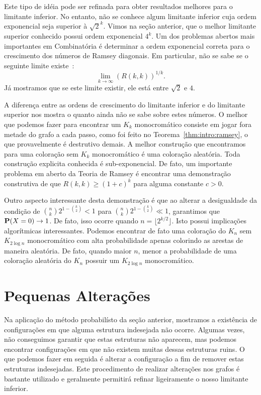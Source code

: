 Este tipo de idéia pode ser refinada para obter resultados melhores para o limitante inferior. No entanto, não se conhece algum limitante inferior cuja ordem exponencial seja superior à $\sqrt{2}^k$. Vimos na seção anterior, que o melhor limitante superior conhecido possui ordem exponencial $4^k$. Um dos problemas abertos mais importantes em Combinatória é determinar a ordem exponencial correta para o crescimento dos números de Ramsey diagonais. Em particular, não se sabe se o seguinte limite existe~\cite{chung1983survey}:
\[ \lim_{k \to \infty} \left(R(k,k)  \right)^{1/k}. \]
Já mostramos que se este limite existir, ele está entre $\sqrt{2}$ e $4$.

A diferença entre as ordens de crescimento do limitante inferior e do limitante superior nos mostra o quanto ainda não se sabe sobre estes números. O melhor que podemos fazer para encontrar um $K_k$ monocromático consiste em jogar fora metade do grafo a cada passo, como foi feito no Teorema~\ref{thm:intro:ramsey}, o que provavelmente é destrutivo demais. A melhor construção que encontramos para uma coloração sem $K_k$ monocromático é uma coloração aleatória. Toda construção explicita conhecida é sub-exponencial. De fato, um importante problema em aberto da Teoria de Ramsey é encontrar uma demonstração construtiva de que $R(k,k) \geq (1+c)^k$ para alguma constante $c > 0$.

Outro aspecto interessante desta demonstração é que ao alterar a desigualdade da condição de $\binom{n}{k} 2^{1 - \binom{k}{2}} < 1$ para $\binom{n}{k} 2^{1 - \binom{k}{2}} \ll 1$, garantimos que $\operatorname{\mathbf{P}}(X = 0) \to 1$. De fato, isso ocorre quando $n = \lfloor 2^{k/2} \rfloor$. Isto possui implicações algorítmicas interessantes. Podemos encontrar de fato uma coloração do $K_n$ sem $K_{2\log n}$ monocromático com alta probabilidade apenas colorindo as arestas de maneira aleatória. De fato, quando maior $n$, menor a probabilidade de uma coloração aleatória do $K_n$ possuir um $K_{2\log n}$ monocromático.


\section{Pequenas Alterações}

Na aplicação do método probabilísto da seção anterior, mostramos a existência de configurações em que alguma estrutura indesejada não ocorre. Algumas vezes, não conseguimos garantir que estas estruturas não aparecem, mas podemos encontrar configurações em que não existem muitas dessas estruturas ruins. O que podemos fazer em seguida é alterar a configuração a fim de remover estas estruturas indesejadas. Este procedimento de realizar alterações nos grafos é bastante utilizado e geralmente permitirá refinar ligeiramente o nosso limitante inferior.

